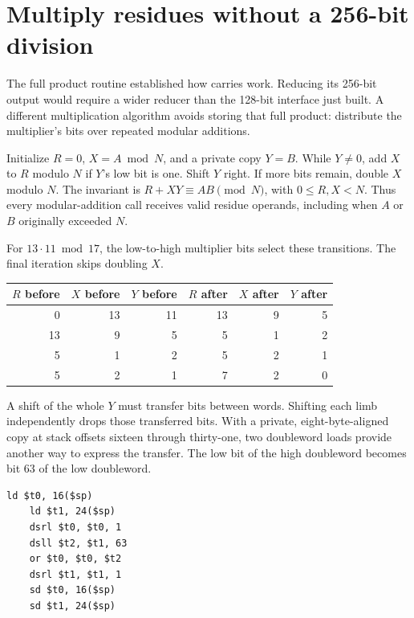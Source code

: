 \section{Multiply residues without a 256-bit division}
The full product routine established how carries work. Reducing its 256-bit output
would require a wider reducer than the 128-bit interface just built. A different
multiplication algorithm avoids storing that full product: distribute the multiplier's
bits over repeated modular additions.

Initialize \(R=0\), \(X=A\bmod N\), and a private copy \(Y=B\). While \(Y\ne0\),
add \(X\) to \(R\) modulo \(N\) if \(Y\)'s low bit is one. Shift \(Y\) right.
If more bits remain, double \(X\) modulo \(N\). The invariant is
\(R+XY\equiv AB\pmod N\), with \(0\leq R,X<N\). Thus every modular-addition call
receives valid residue operands, including when \(A\) or \(B\) originally exceeded
\(N\).

For \(13\cdot11\bmod17\), the low-to-high multiplier bits select these transitions.
The final iteration skips doubling \(X\).
\begin{center}
  \begin{tabular}{rrrrrr}
    \(R\) before & \(X\) before & \(Y\) before & \(R\) after & \(X\) after & \(Y\) after \\
    \hline
    0            & 13           & 11           & 13          & 9           & 5           \\
    13           & 9            & 5            & 5           & 1           & 2           \\
    5            & 1            & 2            & 5           & 2           & 1           \\
    5            & 2            & 1            & 7           & 2           & 0           \\
  \end{tabular}
\end{center}

A shift of the whole \(Y\) must transfer bits between words. Shifting each limb
independently drops those transferred bits. With a private, eight-byte-aligned copy
at stack offsets sixteen through thirty-one, two doubleword loads provide another
way to express the transfer. The low bit of the high doubleword becomes bit 63 of
the low doubleword.

\begin{verbatim}
ld $t0, 16($sp)
    ld $t1, 24($sp)
    dsrl $t0, $t0, 1
    dsll $t2, $t1, 63
    or $t0, $t0, $t2
    dsrl $t1, $t1, 1
    sd $t0, 16($sp)
    sd $t1, 24($sp)
\end{verbatim}

